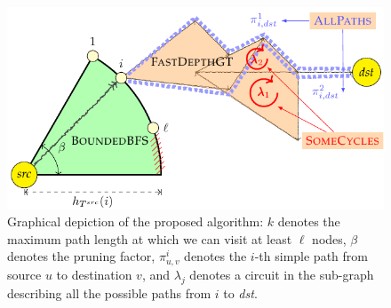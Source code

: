 \documentclass[sigconf]{acmart}
\begin{document}
\begin{figure}[!t]
\includegraphics[width=\linewidth]{fig/algo_intuition}
\caption{Graphical depiction of the proposed algorithm: $k$ denotes the maximum path length at which we can visit at least $\ell$ nodes, $\beta$ denotes the pruning factor, $\pi_{u,v}^i$ denotes the $i$-th simple path from source $u$ to destination $v$, and $\lambda_j$ denotes a circuit in the sub-graph describing all the possible paths from $i$ to \textit{dst}.}\label{fig:depict}
\end{figure}
\end{document}
